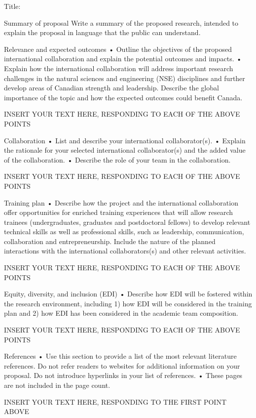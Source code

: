 \documentclass[11pt]{article}
\begin{document}

\renewcommand{\refname}{\CHead{}}

\setlength{\parindent}{0cm}
\setlength{\parskip}{5pt}


Title:

Summary of proposal
Write a summary of the proposed research, intended to explain the proposal in language that the public can understand.


Relevance and expected outcomes %
•	Outline the objectives of the proposed international collaboration and explain the potential outcomes and impacts.
•	Explain how the international collaboration will address important research challenges in the natural sciences and engineering (NSE) disciplines and further develop areas of Canadian strength and leadership. Describe the global importance of the topic and how the expected outcomes could benefit Canada.


INSERT YOUR TEXT HERE, RESPONDING TO EACH OF THE ABOVE POINTS

Collaboration %
•	List and describe your international collaborator(s).
•	Explain the rationale for your selected international collaborator(s) and the added value of the collaboration.
•	Describe the role of your team in the collaboration.

INSERT YOUR TEXT HERE, RESPONDING TO EACH OF THE ABOVE POINTS

Training plan %
•	Describe how the project and the international collaboration offer opportunities for enriched training experiences that will allow research trainees (undergraduates, graduates and postdoctoral fellows) to develop relevant technical skills as well as professional skills, such as leadership, communication, collaboration and entrepreneurship. Include the nature of the planned interactions with the international collaborators(s) and other relevant activities.

INSERT YOUR TEXT HERE, RESPONDING TO EACH OF THE ABOVE POINTS

Equity, diversity, and inclusion (EDI) %
•	Describe how EDI will be fostered within the research environment, including 1) how EDI will be considered in the training plan and 2) how EDI has been considered in the academic team composition.

INSERT YOUR TEXT HERE, RESPONDING TO EACH OF THE ABOVE POINTS

References
•	Use this section to provide a list of the most relevant literature references. Do not refer readers to websites for additional information on your proposal. Do not introduce hyperlinks in your list of references.
•	These pages are not included in the page count.

INSERT YOUR TEXT HERE, RESPONDING TO THE FIRST POINT ABOVE


\end{document}
